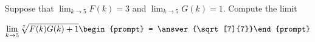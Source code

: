 \documentclass{ximera}
\author{Matthew Carr}
\begin{document}
\begin{exercise}
Suppose that $\lim_{k\to5}F(k)=3$ and $\lim_{k\to5}G(k)=1$. Compute the limit

\[
\lim_{k\to 5 } \sqrt[7]{F(k)G(k)+1}\begin{prompt} = \answer{\sqrt[7]{7}}\end{prompt}
\]
\end{exercise}
\end{document}
